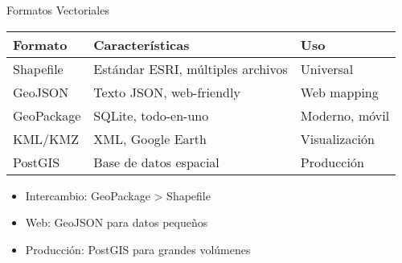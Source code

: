 \documentclass[10pt]{beamer}
\newcommand{\examplebox}[2]{
\begin{tcolorbox}[colframe=usachblue,colback=blue!5,title=#1]
#2
\end{tcolorbox}
}
\begin{document}
\begin{frame}{Formatos Vectoriales}
    \begin{table}
        \small
        \begin{tabular}{lll}
        \toprule
        \textbf{Formato} & \textbf{Características} & \textbf{Uso} \\
        \midrule
        Shapefile & Estándar ESRI, múltiples archivos & Universal \\
        GeoJSON & Texto JSON, web-friendly & Web mapping \\
        GeoPackage & SQLite, todo-en-uno & Moderno, móvil \\
        KML/KMZ & XML, Google Earth & Visualización \\
        PostGIS & Base de datos espacial & Producción \\
        \bottomrule
        \end{tabular}
    \end{table}
    
    \vspace{0.5cm}
    
    \examplebox{Recomendación}{
        \begin{itemize}
            \item Intercambio: GeoPackage > Shapefile
            \item Web: GeoJSON para datos pequeños
            \item Producción: PostGIS para grandes volúmenes
        \end{itemize}
    }
\end{frame}
\end{document}
